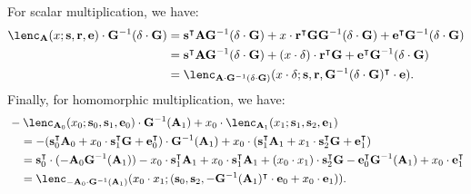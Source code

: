 \documentclass{theoretics}
\begin{document}
For scalar multiplication, we have:
\begin{align*}
    \lenc_\mathbf{A} (x; \mathbf{s}, \mathbf{r}, \mathbf{e}) \cdot \mathbf{G}^{-1}(\delta\cdot \mathbf{G})
    &=\mathbf{s}^\intercal\mathbf{A} \mathbf{G}^{-1}(\delta\cdot \mathbf{G})+x\cdot\mathbf{r}^\intercal \mathbf{G} \mathbf{G}^{-1}(\delta\cdot \mathbf{G})+\mathbf{e}^\intercal \mathbf{G}^{-1}(\delta\cdot \mathbf{G})\\
    &=\mathbf{s}^\intercal\mathbf{A} \mathbf{G}^{-1}(\delta\cdot \mathbf{G})+(x\cdot\delta)\cdot\mathbf{r}^\intercal \mathbf{G} +\mathbf{e}^\intercal \mathbf{G}^{-1}(\delta\cdot \mathbf{G})\\
    &=\lenc_{\mathbf{A}\cdot \mathbf{G}^{-1}(\delta\cdot \mathbf{G})} (x\cdot \delta; \mathbf{s}, \mathbf{r}, \mathbf{G}^{-1}(\delta\cdot \mathbf{G})^\intercal\cdot\mathbf{e}).
\end{align*}
Finally, for homomorphic multiplication, we have:
\begin{align*}
    &-\lenc_{\mathbf{A}_0}(x_0; \mathbf{s}_0, \mathbf{s}_1, \mathbf{e}_0) \cdot \mathbf{G}^{-1}(\mathbf{A}_1)+x_0\cdot \lenc_{\mathbf{A}_1}(x_1; \mathbf{s}_1, \mathbf{s}_2, \mathbf{e}_1)\\
    &\quad=-(\mathbf{s}_0^\intercal\mathbf{A}_0+x_0\cdot\mathbf{s}_1^\intercal \mathbf{G}+\mathbf{e}_0^\intercal)\cdot\mathbf{G}^{-1}(\mathbf{A}_1)+x_0\cdot (\mathbf{s}_1^\intercal\mathbf{A}_1+x_1\cdot\mathbf{s}_2^\intercal \mathbf{G}+ \mathbf{e}_1^\intercal)\\
    &\quad=\mathbf{s}_0^\intercal\cdot(-\mathbf{A}_0\mathbf{G}^{-1}(\mathbf{A}_1))-x_0\cdot \mathbf{s}_1^\intercal\mathbf{A}_1+x_0\cdot \mathbf{s}_1^\intercal\mathbf{A}_1+(x_0\cdot x_1)\cdot\mathbf{s}_2^\intercal \mathbf{G}-\mathbf{e}_0^\intercal\mathbf{G}^{-1}(\mathbf{A}_1)+x_0\cdot \mathbf{e}_1^\intercal\\
    &\quad=\lenc_{-\mathbf{A}_0\cdot \mathbf{G}^{-1}(\mathbf{A}_1)}(x_0\cdot x_1; (\mathbf{s}_0, \mathbf{s}_2, -\mathbf{G}^{-1}(\mathbf{A}_1)^\intercal\cdot \mathbf{e}_0+x_0\cdot\mathbf{e}_1)).
\end{align*}
\end{document}
